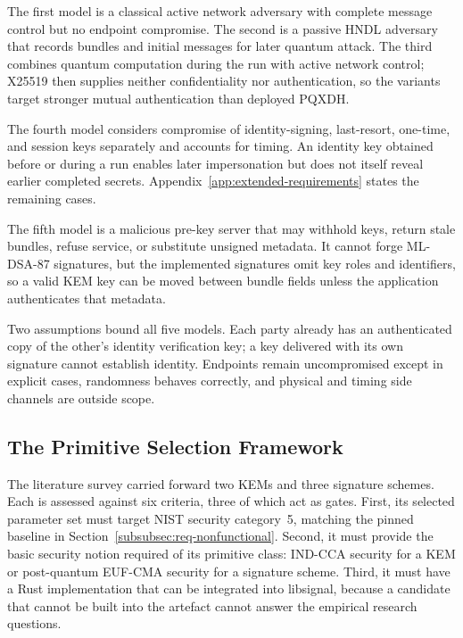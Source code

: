The first model is a classical active network adversary with complete message control but no endpoint compromise. The second is a passive HNDL adversary that records bundles and initial messages for later quantum attack. The third combines quantum computation during the run with active network control; X25519 then supplies neither confidentiality nor authentication, so the variants target stronger mutual authentication than deployed PQXDH.

The fourth model considers compromise of identity-signing, last-resort, one-time, and session keys separately and accounts for timing. An identity key obtained before or during a run enables later impersonation but does not itself reveal earlier completed secrets. Appendix~\ref{app:extended-requirements} states the remaining cases.

The fifth model is a malicious pre-key server that may withhold keys, return stale bundles, refuse service, or substitute unsigned metadata. It cannot forge ML-DSA-87 signatures, but the implemented signatures omit key roles and identifiers, so a valid KEM key can be moved between bundle fields unless the application authenticates that metadata.

Two assumptions bound all five models. Each party already has an authenticated copy of the other's identity verification key; a key delivered with its own signature cannot establish identity. Endpoints remain uncompromised except in explicit cases, randomness behaves correctly, and physical and timing side channels are outside scope.

\subsection{The Primitive Selection Framework}
\label{subsec:selection-framework}

The literature survey carried forward two KEMs and three signature schemes. Each is assessed against six criteria, three of which act as gates. First, its selected parameter set must target NIST security category~5, matching the pinned baseline in Section~\ref{subsubsec:req-nonfunctional}. Second, it must provide the basic security notion required of its primitive class: IND-CCA security for a KEM or post-quantum EUF-CMA security for a signature scheme. Third, it must have a Rust implementation that can be integrated into libsignal, because a candidate that cannot be built into the artefact cannot answer the empirical research questions.

